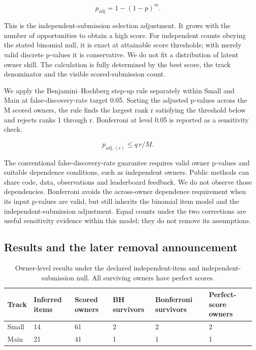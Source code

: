 \[
p_{\mathrm{adj}}=1-(1-p)^m.
\]

This is the independent-submission selection adjustment. It grows with the number of opportunities to obtain a high score. For independent counts obeying the stated binomial null, it is exact at attainable score thresholds; with merely valid discrete p-values it is conservative. We do not fit a distribution of latent owner skill. The calculation is fully determined by the best score, the track denominator and the visible scored-submission count.


We apply the Benjamini--Hochberg step-up rule separately within Small and Main at false-discovery-rate target 0.05. Sorting the adjusted p-values across the M scored owners, the rule finds the largest rank r satisfying the threshold below and rejects ranks 1 through r. Bonferroni at level 0.05 is reported as a sensitivity check. \citep{S11}


\[
p_{\mathrm{adj},(r)}\leq q\,r/M.
\]

The conventional false-discovery-rate guarantee requires valid owner p-values and suitable dependence conditions, such as independent owners. Public methods can share code, data, observations and leaderboard feedback. We do not observe those dependencies. Bonferroni avoids the across-owner dependence requirement when its input p-values are valid, but still inherits the binomial item model and the independent-submission adjustment. Equal counts under the two corrections are useful sensitivity evidence within this model; they do not remove its assumptions.


\subsection{Results and the later removal announcement}

\begin{table}[htbp]

\caption{Owner-level results under the declared independent-item and independent-submission null. All surviving owners have perfect scores.}

\label{tab:1}

\small

\begin{tabularx}{\linewidth}{@{}YYYYYY@{}}

\toprule

\textbf{Track} & \textbf{Inferred items} & \textbf{Scored owners} & \textbf{BH survivors} & \textbf{Bonferroni survivors} & \textbf{Perfect-score owners} \\

\midrule

Small & 14 & 61 & 2 & 2 & 2 \\

Main & 21 & 41 & 1 & 1 & 1 \\

\bottomrule

\end{tabularx}

\end{table}

